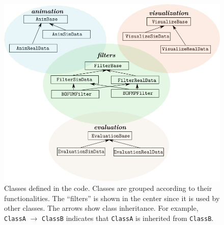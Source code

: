 \begin{figure}[hp]
  \centering
    \includegraphics[width=\textwidth]{figures/classes.png}
    \caption[Classes defined in the code.]{Classes defined in the code. Classes are grouped according to their functionalities. The ``filters'' is shown in the center since it is used by other classes. The arrows show class inheritance. For example, \texttt{ClassA} $\rightarrow$ \texttt{ClassB} indicates that \texttt{ClassA} is inherited from \texttt{ClassB}. }
    \label{fig:classes}
\end{figure}

